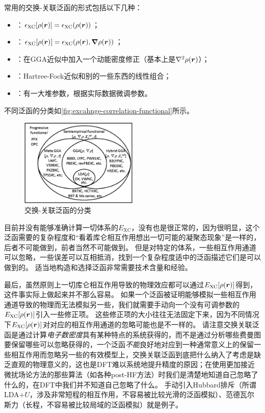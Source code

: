 常用的交换-关联泛函的形式包括以下几种：
\begin{itemize}
    \item {}：$\epsilon_\text{XC}[\rho(\vb*{r})] = \epsilon_\text{XC}(\rho(\vb*{r}))$；
    \item {}：$\epsilon_\text{XC}[\rho(\vb*{r})] = \epsilon_\text{XC}(\rho(\vb*{r}), \grad{\rho(\vb*{r})})$；
    \item {}：在GGA近似中加入一个动能密度修正（基本上是$\laplacian \rho(\vb*{r})$）；
    \item {}：Hartree-Fock近似和别的一些东西的线性组合；
    \item {}：有一大堆参数，根据实际数据微调参数。
\end{itemize}
不同泛函的分类如\autoref{fig:excahnge-correlation-functional}所示。

\begin{figure}
    \centering
    \includegraphics[width=0.5\textwidth]{functional-classification.png}
    \caption{交换-关联泛函的分类}
    \label{fig:excahnge-correlation-functional}
\end{figure}

目前并没有能够准确计算一切体系的$E_\text{XC}$，没有也是很正常的，因为很明显，这个泛函需要的复杂程度和“看着库仑相互作用想出一切可能的凝聚态现象”是一样的，后者不可能做到，前者当然不可能做到。
但是对特定的体系，一些相互作用通道可以忽略，一些误差可以互相抵消，找到一个复杂程度适中的泛函描述它们是可以做到的。
适当地构造和选择泛函非常需要技术含量和经验。

最后，虽然原则上一切库仑相互作用导致的物理效应都可以通过$E_\text{XC}[\rho(\vb*{r})]$得到，这件事实际上做起来并不那么容易。
如果一个泛函被证明能够模拟一些相互作用通道导致的物理而无法模拟另一些，我们就需要手动向一个没有可调参数的$E_\text{XC}[\rho(\vb*{r})]$引入一些修正项。
这些修正项的大小往往无法固定下来，因为不同情况下$E_\text{XC}[\rho(\vb*{r})]$对对应的相互作用通道的忽略可能也是不一样的。
请注意交换关联泛函是通过计算\emph{电子数密度}具有某种特点的系统获得的，而不是通过分析哪些费曼图要保留哪些可以忽略获得的，一个泛函\emph{不能}良好地对应到一种通常意义上的保留一些相互作用而忽略另一些的有效模型上，交换关联泛函到底把什么纳入了考虑是缺乏直观的物理意义的，这也是DFT难以系统地提升精度的原因；在使用更加接近微扰场论方法的那些算法（如各种post-HF方法）时我们是清楚地知道自己忽略了什么的，在DFT中我们并不知道自己忽略了什么。
手动引入Hubbard排斥（所谓LDA+$U$，涉及非常短程的相互作用，不容易被比较光滑的泛函模拟）、范德瓦尔斯力（长程，不容易被比较局域的泛函模拟）就是例子。

